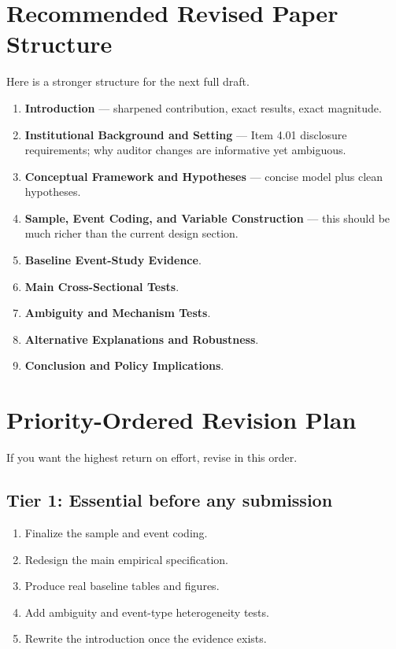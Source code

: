 \documentclass[12pt]{article}
\begin{document}
\section{Recommended Revised Paper Structure}
Here is a stronger structure for the next full draft.

\begin{enumerate}[leftmargin=2em]
    \item \textbf{Introduction} --- sharpened contribution, exact results, exact magnitude.
    \item \textbf{Institutional Background and Setting} --- Item 4.01 disclosure requirements; why auditor changes are informative yet ambiguous.
    \item \textbf{Conceptual Framework and Hypotheses} --- concise model plus clean hypotheses.
    \item \textbf{Sample, Event Coding, and Variable Construction} --- this should be much richer than the current design section.
    \item \textbf{Baseline Event-Study Evidence}.
    \item \textbf{Main Cross-Sectional Tests}.
    \item \textbf{Ambiguity and Mechanism Tests}.
    \item \textbf{Alternative Explanations and Robustness}.
    \item \textbf{Conclusion and Policy Implications}.
\end{enumerate}

\section{Priority-Ordered Revision Plan}
If you want the highest return on effort, revise in this order.

\subsection*{Tier 1: Essential before any submission}
\begin{enumerate}[leftmargin=2em]
    \item Finalize the sample and event coding.
    \item Redesign the main empirical specification.
    \item Produce real baseline tables and figures.
    \item Add ambiguity and event-type heterogeneity tests.
    \item Rewrite the introduction once the evidence exists.
\end{enumerate}
\end{document}
